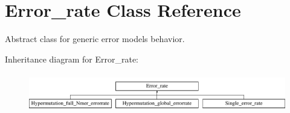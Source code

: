\hypertarget{classError__rate}{}\section{Error\+\_\+rate Class Reference}
\label{classError__rate}


Abstract class for generic error models behavior.  


Inheritance diagram for Error\+\_\+rate\+:\begin{figure}[H]
\begin{center}
\leavevmode
\includegraphics[height=1.696970cm]{dc/d6f/classError__rate}
\end{center}
\end{figure}
